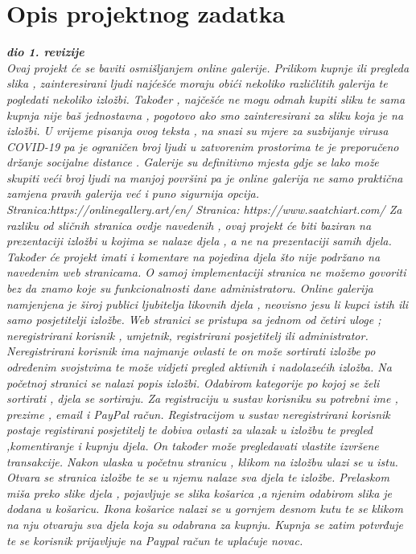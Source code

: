 \chapter{Opis projektnog zadatka}
		
		\textbf{\textit{dio 1. revizije}}\\
		
		\textit{Ovaj projekt će se baviti osmišljanjem online galerije. Prilikom kupnje ili pregleda slika , zainteresirani ljudi najćešće moraju obići nekoliko različlitih galerija te pogledati nekoliko 				izložbi. Također , najčešće ne mogu odmah kupiti sliku te sama kupnja nije baš jednostavna , pogotovo ako smo zainteresirani za sliku koja je na izložbi.  U vrijeme pisanja ovog 				teksta , na snazi su mjere za suzbijanje virusa COVID-19 pa je ograničen broj ljudi u zatvorenim prostorima te je preporučeno držanje socijalne distance . Galerije su definitivno 				mjesta gdje se lako može skupiti 		veći broj ljudi na manjoj površini pa je online galerija ne samo praktična zamjena pravih galerija  već i puno sigurnija opcija. 						Stranica:https://onlinegallery.art/en/ Stranica: https://www.saatchiart.com/
			Za razliku od sličnih stranica ovdje navedenih , ovaj projekt će biti baziran na prezentaciji izložbi u kojima se nalaze djela , a ne na prezentaciji samih djela. Također će projekt 				imati i komentare na pojedina djela što nije podržano na navedenim web stranicama. O samoj implementaciji stranica ne možemo govoriti bez da znamo koje su funkcionalnosti 				dane administratoru.
			Online galerija namjenjena je široj publici ljubitelja likovnih djela , neovisno jesu li kupci istih ili samo posjetitelji izložbe. 
			Web stranici se pristupa sa jednom od četiri uloge ; neregistrirani korisnik , umjetnik, registrirani posjetitelj ili administrator. Neregistrirani korisnik ima najmanje ovlasti te on može 				sortirati izložbe po određenim svojstvima te može vidjeti pregled aktivnih i nadolazećih izložba. 
			Na početnoj stranici se nalazi popis izložbi. Odabirom kategorije po kojoj se želi sortirati , djela se sortiraju.
			Za registraciju u sustav korisniku su potrebni ime , prezime , email i PayPal račun.
			Registracijom u sustav neregistrirani korisnik postaje registirani posjetitelj te dobiva ovlasti za ulazak u izložbu te pregled ,komentiranje i kupnju djela. On također može 					pregledavati vlastite izvršene transakcije.
			Nakon ulaska u početnu stranicu , klikom na izložbu ulazi se u istu. Otvara se stranica izložbe te se u njemu nalaze sva djela te izložbe.
			Prelaskom miša preko slike djela , pojavljuje se slika košarica ,a njenim odabirom slika je dodana u košaricu. Ikona košarice nalazi se u gornjem desnom kutu te se klikom na nju 				otvaraju sva djela koja su odabrana za kupnju. Kupnja se zatim potvrđuje te se korisnik prijavljuje na Paypal račun te uplaćuje novac. 
}
